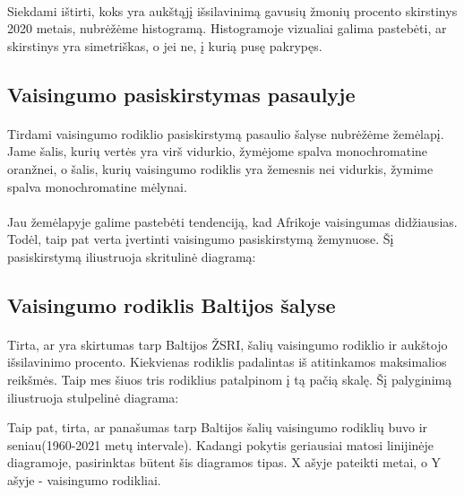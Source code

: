 \paragraph{} Siekdami ištirti, koks yra aukštąjį išsilavinimą gavusių žmonių procento skirstinys 2020 metais, nubrėžėme histogramą. Histogramoje vizualiai galima pastebėti, ar skirstinys yra simetriškas, o jei ne, į kurią pusę pakrypęs.
\pagebreak

\subsection{Vaisingumo pasiskirstymas pasaulyje}
\paragraph{} Tirdami vaisingumo rodiklio pasiskirstymą pasaulio šalyse nubrėžėme žemėlapį. Jame šalis, kurių vertės yra virš vidurkio, žymėjome spalva monochromatine oranžnei, o šalis, kurių vaisingumo rodiklis yra žemesnis nei vidurkis, žymime spalva monochromatine mėlynai.

\paragraph{} Jau žemėlapyje galime pastebėti tendenciją, kad Afrikoje vaisingumas didžiausias. Todėl, taip pat verta įvertinti vaisingumo pasiskirstymą žemynuose. Šį pasiskirstymą iliustruoja skritulinė diagramą:
\hypertarget{pie}{}
\pagebreak

\subsection{Vaisingumo rodiklis Baltijos šalyse}
\paragraph{} Tirta, ar yra skirtumas tarp Baltijos ŽSRI, šalių vaisingumo rodiklio ir aukštojo išsilavinimo procento. Kiekvienas rodiklis padalintas iš atitinkamos maksimalios reikšmės. Taip mes šiuos tris rodiklius patalpinom į tą pačią skalę. Šį palyginimą iliustruoja stulpelinė diagrama:

Taip pat, tirta, ar panašumas tarp Baltijos šalių vaisingumo rodiklių buvo ir seniau(1960-2021 metų intervale). Kadangi pokytis geriausiai matosi linijinėje diagramoje, pasirinktas būtent šis diagramos tipas. X ašyje pateikti metai, o Y ašyje - vaisingumo rodikliai.
\pagebreak


